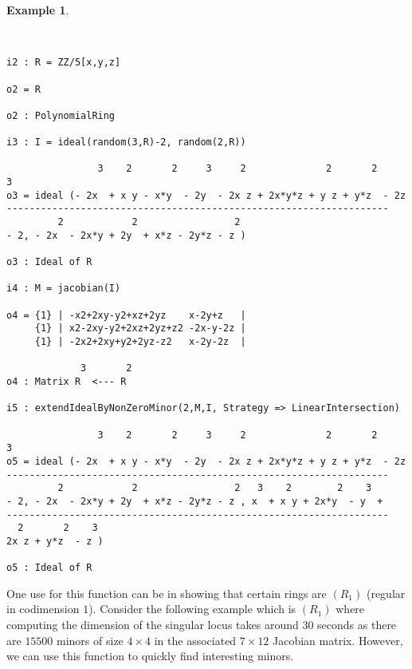 \documentclass[11pt]{amsart}
\theoremstyle{definition}
\newtheorem{example}{Example}[section]
\begin{document}
\vspace{1em}
\begin{example}~~
	
	~~
	
	{{\small\color{blue}
\begin{verbatim}
i2 : R = ZZ/5[x,y,z]

o2 = R

o2 : PolynomialRing

i3 : I = ideal(random(3,R)-2, random(2,R))

                3    2       2     3     2              2       2     3
o3 = ideal (- 2x  + x y - x*y  - 2y  - 2x z + 2x*y*z + y z + y*z  - 2z 
-------------------------------------------------------------------
         2            2                 2
- 2, - 2x  - 2x*y + 2y  + x*z - 2y*z - z )

o3 : Ideal of R

i4 : M = jacobian(I)

o4 = {1} | -x2+2xy-y2+xz+2yz    x-2y+z   |
     {1} | x2-2xy-y2+2xz+2yz+z2 -2x-y-2z |
     {1} | -2x2+2xy+y2+2yz-z2   x-2y-2z  |

             3       2
o4 : Matrix R  <--- R

i5 : extendIdealByNonZeroMinor(2,M,I, Strategy => LinearIntersection)

                3    2       2     3     2              2       2     3
o5 = ideal (- 2x  + x y - x*y  - 2y  - 2x z + 2x*y*z + y z + y*z  - 2z 
-------------------------------------------------------------------
         2            2                 2   3    2        2    3  
- 2, - 2x  - 2x*y + 2y  + x*z - 2y*z - z , x  + x y + 2x*y  - y  +
-------------------------------------------------------------------
  2       2    3
2x z + y*z  - z )

o5 : Ideal of R
\end{verbatim}	
}}	
\end{example}

One use for this function can be in showing that certain rings are $(R_1)$ (regular in codimension $1$).
Consider the following example which is $(R_1)$ where computing the dimension of the singular locus takes around $30$ seconds as there are $15500$ minors of size $4 \times 4$ in the associated $7 \times 12$ Jacobian matrix.  However, we can use this function to quickly find interesting minors.

\vspace{1em}
\end{document}
